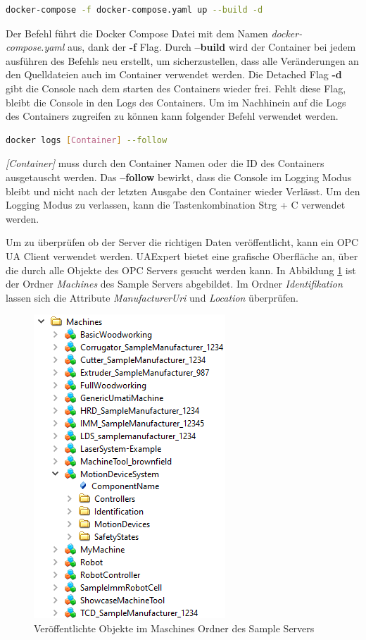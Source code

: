 \documentclass[a4paper, 12pt, oneside, toc=listofnumbered, bibliography=totoc]{scrbook}
\begin{document}
		\begin{lstlisting}[numbers=none, language=bash, frame=single]
			docker-compose -f docker-compose.yaml up --build -d
		\end{lstlisting}
		
		Der Befehl führt die Docker Compose Datei mit dem Namen \textit{docker-compose.yaml} aus, dank der \textbf{-f} Flag. Durch \textbf{--build} wird der Container bei jedem ausführen des Befehls neu erstellt, um sicherzustellen, dass alle Veränderungen an den Quelldateien auch im Container verwendet werden. Die Detached Flag \textbf{-d} gibt die Console nach dem starten des Containers wieder frei. Fehlt diese Flag, bleibt die Console in den Logs des Containers. Um im Nachhinein auf die Logs des Containers zugreifen zu können kann folgender Befehl verwendet werden. 
		   
		\begin{lstlisting}[numbers=none, language=bash, frame=single]
			docker logs [Container] --follow
		\end{lstlisting}
		
		\textit{[Container]} muss durch den Container Namen oder die ID des Containers ausgetauscht werden. Das \textbf{--follow} bewirkt, dass die Console im Logging Modus bleibt und nicht nach der letzten Ausgabe den Container wieder Verlässt. Um den Logging Modus zu verlassen, kann die Tastenkombination Strg + C verwendet werden.
		
		Um zu überprüfen ob der Server die richtigen Daten veröffentlicht, kann ein OPC UA Client verwendet werden. UAExpert bietet eine grafische Oberfläche an, über die durch alle Objekte des OPC Servers gesucht werden kann. In Abbildung \ref{fig:UAExpert} ist der Ordner \textit{Machines} des Sample Servers abgebildet. Im Ordner \textit{Identifikation} lassen sich die Attribute \textit{ManufacturerUri} und \textit{Location} überprüfen.
		
		\begin{figure}[H]
			\centering
			\includegraphics[height=0.7\linewidth]{res/UAExpert.png}
			\caption{Veröffentlichte Objekte im Maschines Ordner des Sample Servers}
			\label{fig:UAExpert}
		\end{figure}
		
\end{document}
